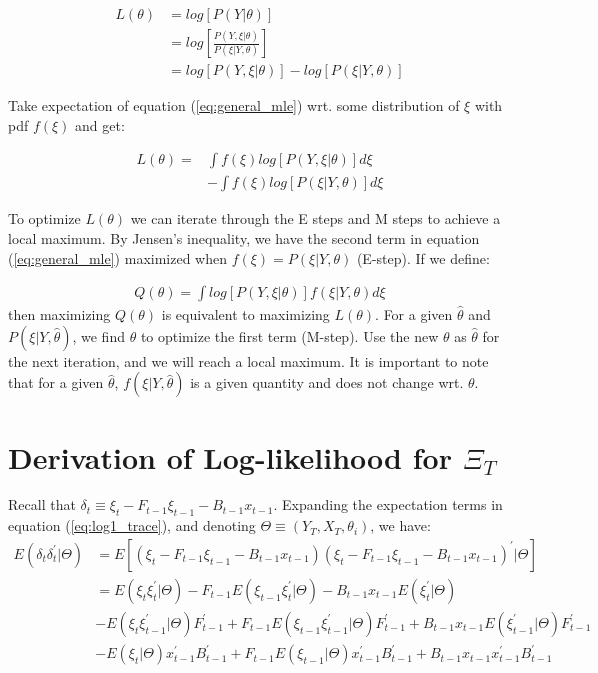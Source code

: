 \documentclass[12pt]{article}
\numberwithin{equation}{section}
\begin{document}
\begin{align}
    L(\theta) & = log[P(Y|\theta)] \nonumber \\
    & = log\left[\frac{P(Y,\xi|\theta)}{P(\xi|Y,\theta)}\right] \nonumber \\
    & = log[P(Y,\xi|\theta)] - log[P(\xi|Y,\theta)] \label{eq:general_mle}
\end{align}

Take expectation of equation (\ref{eq:general_mle}) wrt. some distribution of $\xi$ with pdf $f(\xi)$ and get:

\begin{align}
    L(\theta) = & \int f(\xi)log[P(Y,\xi|\theta)]d\xi \nonumber \\
    & - \int f(\xi)log[P(\xi|Y,\theta)]d\xi \nonumber
\end{align}

To optimize $L(\theta)$ we can iterate through the E steps and M steps to achieve a local maximum. By Jensen's inequality, we have the second term in equation (\ref{eq:general_mle}) maximized when $f(\xi)=P(\xi|Y,\theta)$ (E-step). If we define:

\begin{align}
    Q(\theta) = \int log[P(Y,\xi|\theta)]f(\xi|Y,\theta)d\xi \label{eq:Q}
\end{align}
then maximizing $Q(\theta)$ is equivalent to maximizing $ L(\theta)$. For a given $\hat{\theta}$ and $P(\xi|Y, \hat{\theta})$, we find $\theta$ to optimize the first term (M-step). Use the new $\theta$ as $\hat{\theta}$ for the next iteration, and we will reach a local maximum. It is important to note that for a given $\hat{\theta}$, $f(\xi|Y, \hat{\theta})$ is a given quantity and does not change wrt. $\theta$. 
\section{Derivation of Log-likelihood for $\Xi_T$} \label{ap:log}
Recall that $\delta_t \equiv \xi_t - F_{t-1}\xi_{t-1} - B_{t-1}x_{t-1}$. Expanding the expectation terms in equation (\ref{eq:log1_trace}), and denoting $\Theta \equiv (Y_T,X_T, \theta_i)$, we have:
\begin{align*}
    E(\delta_t\delta_t^{'}|\Theta) &= E[(\xi_t-F_{t-1}\xi_{t-1}-B_{t-1}x_{t-1}) 
    (\xi_t-F_{t-1}\xi_{t-1}-B_{t-1}x_{t-1})^{'}|\Theta] \\
    &= E(\xi_t\xi_t^{'}|\Theta) - F_{t-1}E(\xi_{t-1}\xi_{t}^{'}|\Theta) - B_{t-1}x_{t-1}E(\xi_t^{'}|\Theta) \\
    &- E(\xi_t\xi_{t-1}^{'}|\Theta)F_{t-1}^{'} + F_{t-1}E(\xi_{t-1}\xi_{t-1}^{'}|\Theta)F_{t-1}^{'}
    +B_{t-1}x_{t-1}E(\xi_{t-1}^{'}|\Theta)F_{t-1}^{'} \\
    &- E(\xi_t|\Theta)x_{t-1}^{'}B_{t-1}^{'} + F_{t-1}E(\xi_{t-1}|\Theta)x_{t-1}^{'}B_{t-1}^{'}
    +B_{t-1}x_{t-1}x_{t-1}^{'}B_{t-1}^{'}
\end{align*}
\end{document}
